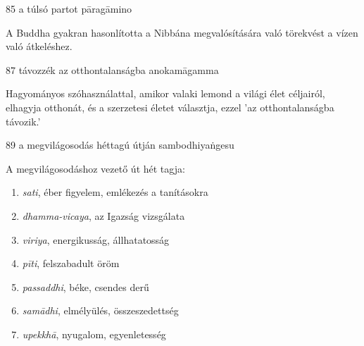 
\begin{notesdescription}

\item[{85}
{a túlsó partot}
{pāragāmino}] \hfill\par

A Buddha gyakran hasonlította a Nibbána megvalósítására való törekvést a vízen való átkeléshez.

\item[{87}
{távozzék az otthontalanságba}
{anokamāgamma}] \hfill\par

Hagyományos szóhasználattal, amikor valaki lemond a világi élet céljairól, elhagyja otthonát, és a szerzetesi életet választja, ezzel 'az otthontalanságba távozik.'

\item[{89}
{a megvilágosodás héttagú útján}
{sambodhiyaṅgesu}] \hfill\par

A megvilágosodáshoz vezető út hét tagja:
\begin{enumerate}
    \item \textit{sati}, éber figyelem, emlékezés a tanításokra
    \item \textit{dhamma-vicaya}, az Igazság vizsgálata
    \item \textit{viriya}, energikusság, állhatatosság
    \item \textit{pīti}, felszabadult öröm
    \item \textit{passaddhi}, béke, csendes derű
    \item \textit{samādhi}, elmélyülés, összeszedettség
    \item \textit{upekkhā}, nyugalom, egyenletesség
\end{enumerate}

\end{notesdescription}

